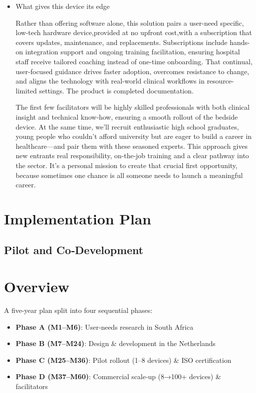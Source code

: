 \documentclass[a4paper,11pt]{article}
\begin{document}
\begin{itemize}
 \item What gives this device its edge

Rather than offering software alone, this solution pairs a user-need specific, low-tech hardware device,provided at no upfront cost,with a subscription that covers updates, maintenance, and replacements. Subscriptions include hands-on integration support and ongoing training facilitation, ensuring hospital staff receive tailored coaching instead of one-time onboarding. That continual, user-focused guidance drives faster adoption, overcomes resistance to change, and aligns the technology with real-world clinical workflows in resource-limited settings. The product is completed documentation.

The first few facilitators will be highly skilled professionals with both clinical insight and technical know‑how, ensuring a smooth rollout of the bedside device. At the same time, we’ll recruit enthusiastic high school graduates, young people who couldn’t afford university but are eager to build a career in healthcare—and pair them with these seasoned experts. This approach gives new entrants real responsibility, on‑the‑job training and a clear pathway into the sector. It’s a personal mission to create that crucial first opportunity, because sometimes one chance is all someone needs to launch a meaningful career.

\end{itemize}



\section{Implementation Plan}
\subsection{Pilot and Co‐Development}

\section*{Overview}
A five-year plan split into four sequential phases:
\begin{itemize}
  \item \textbf{Phase A (M1–M6)}: User‐needs research in South Africa
  \item \textbf{Phase B (M7–M24)}: Design \& development in the Netherlands
  \item \textbf{Phase C (M25–M36)}: Pilot rollout (1–8 devices) \& ISO certification
  \item \textbf{Phase D (M37–M60)}: Commercial scale‐up (8→100+ devices) \& facilitators
\end{itemize}
\end{document}
